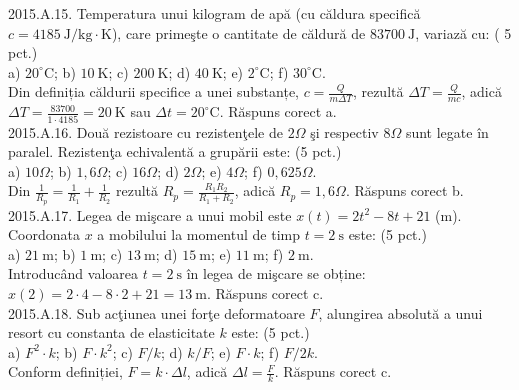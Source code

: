 2015.A.15. Temperatura unui kilogram de apă (cu căldura specifică $c=4185 \mathrm{~J} / \mathrm{kg} \cdot \mathrm{K}$), care primeşte o cantitate de căldură de $83700 \mathrm{~J}$, variază cu: ( 5 pct.)\\ a) $20^{\circ} \mathrm{C}$; b) $10 \mathrm{~K}$; c) $200 \mathrm{~K}$; d) $40 \mathrm{~K}$; e) $2^{\circ} \mathrm{C}$; f) $30^{\circ} \mathrm{C}$.\\ Din definiția căldurii specifice a unei substanțe, $c=\frac{Q}{m \Delta T}$, rezultă $\Delta T=\frac{Q}{m c}$, adică $\Delta T=\frac{83700}{1 \cdot 4185}=20 \mathrm{~K}$ sau $\Delta t=20^{\circ} \mathrm{C}$. Răspuns corect a.\\

2015.A.16. Două rezistoare cu rezistenţele de $2 \Omega$ şi respectiv $8 \Omega$ sunt legate în paralel. Rezistenţa echivalentă a grupării este: (5 pct.)\\ a) $10 \Omega$; b) $1,6 \Omega$; c) $16 \Omega$; d) $2 \Omega$; e) $4 \Omega$; f) $0,625 \Omega$.\\ Din $\frac{1}{R_{p}}=\frac{1}{R_{1}}+\frac{1}{R_{2}}$ rezultă $R_{p}=\frac{R_{1} R_{2}}{R_{1}+R_{2}}$, adică $R_{p}=1,6 \Omega$. Răspuns corect b.\\

2015.A.17. Legea de mişcare a unui mobil este $x(t)=2 t^{2}-8 t+21$ (m). Coordonata $x$ a mobilului la momentul de timp $t=2 \mathrm{~s}$ este: (5 pct.)\\ a) $21 \mathrm{~m}$; b) $1 \mathrm{~m}$; c) $13 \mathrm{~m}$; d) $15 \mathrm{~m}$; e) $11 \mathrm{~m}$; f) $2 \mathrm{~m}$.\\ Introducând valoarea $t=2 \mathrm{~s}$ în legea de mişcare se obține:\\ $x(2)=2 \cdot 4-8 \cdot 2+21=13 \mathrm{~m}$. Răspuns corect c.\\

2015.A.18. Sub acţiunea unei forţe deformatoare $F$, alungirea absolută a unui resort cu constanta de elasticitate $k$ este: (5 pct.)\\ a) $F^{2} \cdot k$; b) $F \cdot k^{2}$; c) $F / k$; d) $k / F$; e) $F \cdot k$; f) $F / 2 k$.\\ Conform definiției, $F=k \cdot \Delta l$, adică $\Delta l=\frac{F}{k}$. Răspuns corect c.\\
